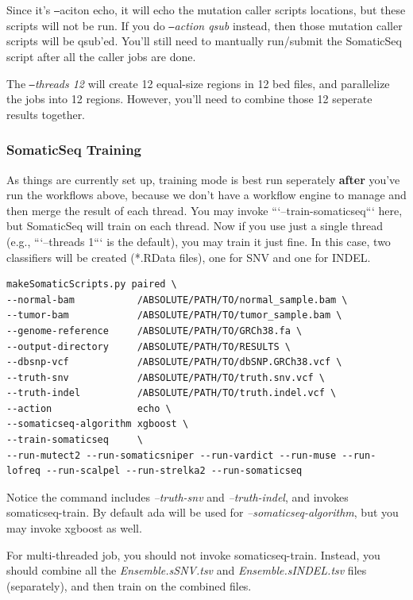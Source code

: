 \documentclass[10pt,letterpaper]{article}
\begin{document}
\begin{sloppypar}
Since it's \texttt{--}aciton echo, it will echo the mutation caller scripts locations, but these scripts will not be run. If you do \textit{\texttt{--}action qsub} instead, then those mutation caller scripts will be qsub'ed. You'll still need to mantually run/submit the SomaticSeq script after all the caller jobs are done.

The \textit{\texttt{--}threads 12} will create 12 equal-size regions in 12 bed files, and parallelize the jobs into 12 regions. However, you'll need to combine those 12 seperate results together. 




\subsubsection{SomaticSeq Training}

As things are currently set up, training mode is best run seperately \textbf{after} you've run the workflows above, because we don't have a workflow engine to manage and then merge the result of each thread. You may invoke ```--train-somaticseq``` here, but SomaticSeq will train on each thread. Now if you use just a single thread (e.g., ```--threads 1``` is the default), you may train it just fine. In this case, two classifiers will be created (*.RData files), one for SNV and one for INDEL.

\begin{lstlisting}
makeSomaticScripts.py paired \
--normal-bam           /ABSOLUTE/PATH/TO/normal_sample.bam \
--tumor-bam            /ABSOLUTE/PATH/TO/tumor_sample.bam \
--genome-reference     /ABSOLUTE/PATH/TO/GRCh38.fa \
--output-directory     /ABSOLUTE/PATH/TO/RESULTS \
--dbsnp-vcf            /ABSOLUTE/PATH/TO/dbSNP.GRCh38.vcf \
--truth-snv            /ABSOLUTE/PATH/TO/truth.snv.vcf \
--truth-indel          /ABSOLUTE/PATH/TO/truth.indel.vcf \
--action               echo \
--somaticseq-algorithm xgboost \
--train-somaticseq     \
--run-mutect2 --run-somaticsniper --run-vardict --run-muse --run-lofreq --run-scalpel --run-strelka2 --run-somaticseq
\end{lstlisting}

Notice the command includes \textit{--truth-snv} and \textit{--truth-indel}, and invokes somaticseq-train. By default ada will be used for \textit{--somaticseq-algorithm}, but you may invoke xgboost as well.

For multi-threaded job, you should not invoke somaticseq-train. Instead, you should combine all the \textit{Ensemble.sSNV.tsv} and \textit{Ensemble.sINDEL.tsv} files (separately), and then train on the combined files. 





\end{sloppypar}
\end{document}
